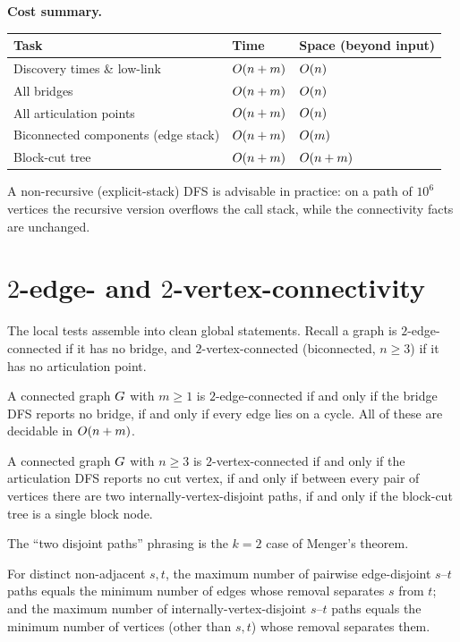 \begin{complexitybox}
\textbf{Cost summary.}
\begin{center}
\begin{tabular}{lll}
\toprule
Task & Time & Space (beyond input)\\
\midrule
Discovery times \& low-link & $O(n+m)$ & $O(n)$\\
All bridges & $O(n+m)$ & $O(n)$\\
All articulation points & $O(n+m)$ & $O(n)$\\
Biconnected components (edge stack) & $O(n+m)$ & $O(m)$\\
Block-cut tree & $O(n+m)$ & $O(n+m)$\\
\bottomrule
\end{tabular}
\end{center}
A non-recursive (explicit-stack) DFS is advisable in practice: on a path of $10^6$
vertices the recursive version overflows the call stack, while the connectivity facts
are unchanged.
\end{complexitybox}

\section{$2$-edge- and $2$-vertex-connectivity}
\label{ch10:2conn}

The local tests assemble into clean global statements. Recall a graph is
$2$-edge-connected if it has no bridge, and $2$-vertex-connected (biconnected, $n\ge3$)
if it has no articulation point.

\begin{corollary}
\label{ch10:cor-2ec}
A connected graph $G$ with $m\ge1$ is $2$-edge-connected if and only if the bridge DFS reports
no bridge, if and only if every edge lies on a cycle. All of these are decidable in $O(n+m)$.
\end{corollary}

\begin{corollary}
\label{ch10:cor-2vc}
A connected graph $G$ with $n\ge3$ is $2$-vertex-connected if and only if the articulation DFS
reports no cut vertex, if and only if between every pair of vertices there are two
internally-vertex-disjoint paths, if and only if the block-cut tree is a single block node.
\end{corollary}

The ``two disjoint paths'' phrasing is the $k=2$ case of Menger's theorem.

\begin{theorem}
\label{ch10:thm-menger}
For distinct non-adjacent $s,t$, the maximum number of pairwise edge-disjoint $s$--$t$
paths equals the minimum number of edges whose removal separates $s$ from $t$; and the
maximum number of internally-vertex-disjoint $s$--$t$ paths equals the minimum number
of vertices (other than $s,t$) whose removal separates them.
\end{theorem}

